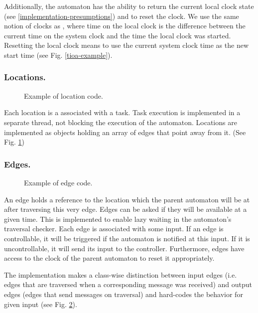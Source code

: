 Additionally, the automaton has the ability to return the current
local clock state (see \ref{implementation-presumptions}) and to
reset the clock. We use the same notion of clocks as \cite{amnell_code_2002},
where time on the local clock is the difference between the current
time on the system clock and the time the local clock was started.
Resetting the local clock means to use the current system clock time
as the new start time (see Fig. \ref{tioa-example}).

\subsubsection{Locations.}

\begin{figure}[t]

\caption{Example of location code.}
\label{location-example}
\end{figure}

Each location is a associated with a task. Task execution is implemented
in a separate thread, not blocking the execution of the automaton.
Locations are implemented as objects holding an array of edges that
point away from it. (See Fig. \ref{location-example})


\subsubsection{Edges.}
\label{subsubsec:edges}

\begin{figure}[t]

\caption{Example of edge code.}
\label{edge-example}
\end{figure}

An edge holds a reference to the location which the parent automaton
will be at after traversing this very edge. Edges can be asked if
they will be available at a given time. This is implemented to enable
lazy waiting in the automaton's traversal checker. Each edge is associated
with some input. If an edge is controllable, it will be triggered
if the automaton is notified at this input. If it is uncontrollable,
it will send its input to the controller. Furthermore, edges have
access to the clock of the parent automaton to reset it appropriately.

The implementation makes a class-wise distinction between input edges
(i.e. edges that are traversed when a corresponding message was received) and
output edges (edges that send messages on traversal) and hard-codes the behavior
for given input (see Fig. \ref{edge-example}).


